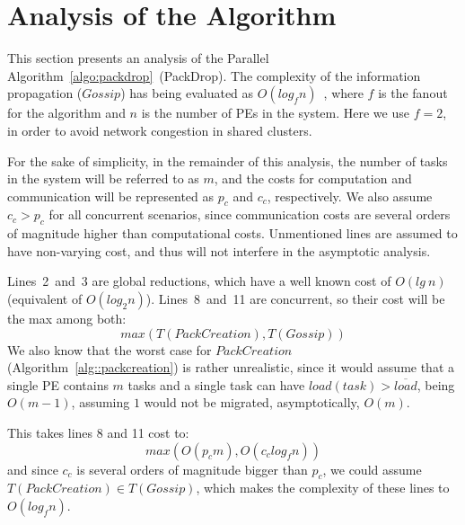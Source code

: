 \section{Analysis of the Algorithm}

This section presents an analysis of the Parallel Algorithm~\ref{algo:packdrop}~(PackDrop). 
The complexity of the information propagation ($Gossip$) has being evaluated as $O(log_fn)$~\cite{grapevine},
where $f$ is the fanout for the algorithm and $n$ is the number of PEs in the system.
Here we use $f=2$, in order to avoid network congestion in shared clusters. %

For the sake of simplicity, in the remainder of this analysis, the number of tasks in the system
will be referred to as $m$, and the costs for computation and communication will be represented as $p_c$ and $c_c$, respectively.
We also assume $c_c > p_c$ for all concurrent scenarios, since communication costs are several orders of magnitude higher than computational costs.
Unmentioned lines are assumed to have non-varying cost, and thus will not interfere in the asymptotic analysis.

Lines~2~and~3 are global reductions, which have a well known cost of $O(lg\ n)$ (equivalent of $O(log_2n)$).
Lines~8~and~11 are concurrent, so their cost will be the max among both:
\begin{equation*}
  max(T(PackCreation),T(Gossip))
\end{equation*}
We also know that the worst case for $PackCreation$ (Algorithm~\ref{alg::packcreation}) is rather unrealistic, 
since it would assume that a single PE contains $m$ tasks and a single task can have $load(task) > \overline{load}$, being $O(m-1)$, assuming $1$ would not be migrated, asymptotically, $O(m)$.


This takes lines 8 and 11 cost to:
\begin{equation*}
 max(O(p_cm),O(c_clog_fn))
\end{equation*}
and since $c_c$ is several orders of magnitude bigger than $p_c$, we could assume $T(PackCreation)\in T(Gossip)$, which makes the 
complexity of these lines to $O(log_fn)$.

